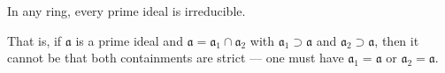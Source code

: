 In any ring, every prime ideal is irreducible.

That is, if $\mathfrak{a}$ is a prime ideal and $\mathfrak{a} = \mathfrak{a}_1 \cap \mathfrak{a}_2$ with $\mathfrak{a}_1 \supset \mathfrak{a}$ and $\mathfrak{a}_2 \supset \mathfrak{a}$, then it cannot be that both containments are strict — one must have $\mathfrak{a}_1 = \mathfrak{a}$ or $\mathfrak{a}_2 = \mathfrak{a}$.
